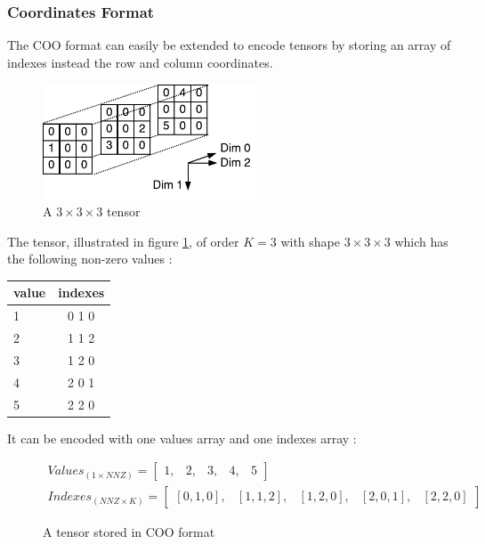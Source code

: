 \subsubsection{Coordinates Format} \label{sssec:coo}
The COO format can easily be extended to encode tensors by storing an array of indexes instead the row and column coordinates. 

\begin{figure}[h]
	\begin{center}
		\includegraphics[width=2.5in]{images/tensorscooexpl.pdf} 
		\caption{A $3\times 3\times 3$ tensor}
        \label{fig:tensorCOO}
	\end{center}
\end{figure}
The tensor, illustrated in figure \ref{fig:tensorCOO}, of order $K = 3$ with shape $3\times 3 \times 3$ which has the following non-zero values :
\begin{center}
	\begin{tabular}{ l | c  }
		value & indexes\\ \hline
		1 & 0 1 0\\ \hline
		2 & 1 1 2 \\ \hline
		3 & 1 2 0 \\ \hline
		4 & 2 0 1 \\ \hline
		5 & 2 2 0 \\ 
		
	\end{tabular}
\end{center}

It can be encoded with one values array and one indexes array :
\begin{figure}[h]
	\[
	\begin{aligned}
	Values_{(1\times NNZ)} = 
	\begin{bmatrix}
	1, &  2, & 3, & 4, & 5
	\end{bmatrix}
	\\
	Indexes_{(NNZ \times K)} = 
	\begin{bmatrix}
	[0, 1, 0] ,&  [1, 1, 2], & [1, 2, 0], & [2, 0, 1], & [2, 2, 0]
	\end{bmatrix}
	\end{aligned}
	\]
	\caption{A tensor stored in COO format}
		\label{fig:cooformattensor}
\end{figure}


